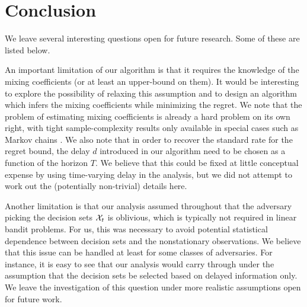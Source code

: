 \section{Conclusion}

We leave several interesting questions open for future research. Some of these are listed below.


An important limitation of our algorithm is that it requires the knowledge of the mixing coefficients (or at least an 
upper-bound on them). It would be interesting to explore the possibility of relaxing this assumption and to design an 
algorithm which infers the mixing coefficients while minimizing the regret. We note that the problem of estimating 
mixing coefficients is already a hard problem on its own right, with tight sample-complexity results only available in 
special cases such as Markov chains \citep{hsu2019mixing,wolfer2020mixing}. We also note that in order to recover the 
standard rate for the regret bound, the delay $d$ introduced in our algorithm need to be chosen as a function of the 
horizon $T$. We believe that this could be fixed at little conceptual expense by using time-varying delay in the 
analysis, but we did not attempt to work out the (potentially non-trivial) details here.

Another limitation is that our analysis assumed throughout that the adversary picking the decision sets $\mathcal{X}_t$ is 
oblivious, which is typically not required in linear bandit problems. For us, this was necessary to avoid potential 
statistical dependence between decision sets and the nonstationary observations. We believe that this issue can be 
handled at least for some classes of adversaries. For instance, it is easy to see that our analysis would carry through 
under the assumption that the decision sets be selected based on delayed information only. We leave the investigation 
of this question under more realistic assumptions open for future work.







